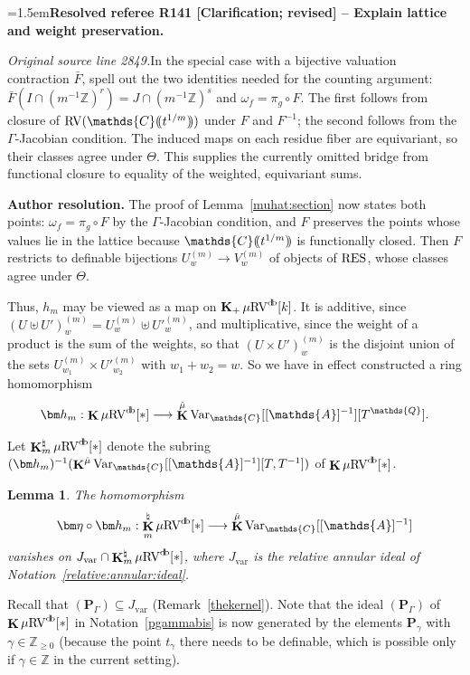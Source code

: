 \documentclass[12pt]{amsart}
\newcommand{\ResolvedRefereeRemark}[5]{%
  \par\medskip\begingroup\normalfont\small\color{gray}%
  \emergencystretch=1.5em\noindent\textbf{Resolved referee R#1 [#2] -- #3.}\par\nobreak\noindent #4\par
  \medskip\color{ResolutionGreen}\noindent\textbf{Author resolution.} #5\par
  \endgroup\medskip
}
\theoremstyle{plain}
\newtheorem{lem}[thm]{Lemma}
\theoremstyle{definition}
\theoremstyle{remark}
\numberwithin{equation}{section}
\theoremstyle{plain}
\newcommand{\RV}{\textup{RV}}
\newcommand{\Z}{\mathds{Z}}
\newcommand{\A}{\mathds{A}}
\newcommand{\C}{\mathds{C}}
\newcommand{\Q}{\mathds{Q}}
\newcommand{\0}{\emptyset}
\newcommand{\dpar}[1]{%
   (\mkern-4mu (#1 )\mkern-4mu )}
\newcommand{\fun}{\longrightarrow}
\newcommand{\sub}{\subseteq}
\newcommand{\mgRV}{{\mu}{\RV}}
\newcommand{\RES}{\textup{RES}}
\DeclareMathOperator{\gsk}{\mathbf{K}_+}
\DeclareMathOperator{\ggk}{\mathbf{K}}
\DeclareMathOperator{\db}{d \! b}
\newcommand{\var}{\textup{Var}}
\newcommand{\gmv}{\ggk^{\hat \mu}\var_{\C}}
\begin{document}
\ResolvedRefereeRemark{141}{Clarification; revised}{Explain lattice and weight preservation}{%
\textit{Original source line 2849.}\quad In the special case with a bijective valuation contraction $\bar F$, spell out the two identities needed for the counting argument: $\bar F(I\cap(m^{-1}\Z)^r)=J\cap(m^{-1}\Z)^s$ and $\omega_f=\pi_g\circ F$. The first follows from closure of $\RV(\C\dpar{t^{1/m}})$ under $F$ and $F^{-1}$; the second follows from the $\Gamma$-Jacobian condition. The induced maps on each residue fiber are equivariant, so their classes agree under $\Theta$. This supplies the currently omitted bridge from functional closure to equality of the weighted, equivariant sums.
}{The proof of Lemma~\ref{muhat:section} now states both points: $\omega_f=\pi_g\circ F$ by the $\Gamma$-Jacobian condition, and $F$ preserves the points whose values lie in the lattice because $\C\dpar{t^{1/m}}$ is functionally closed. Then $F$ restricts to definable bijections $U^{(m)}_w\fun V^{(m)}_w$ of objects of $\RES$, whose classes agree under $\Theta$.}

Thus, $h_m$ may be viewed as a map on $\gsk \mgRV^{\db}[k]$. It is additive, since $(U \uplus U')^{(m)}_w = U^{(m)}_w \uplus U'^{(m)}_w$, and multiplicative, since the weight of a product is the sum of the weights, so that $(U \times U')^{(m)}_w$ is the disjoint union of the sets $U^{(m)}_{w_1} \times U'^{(m)}_{w_2}$ with $w_1 + w_2 = w$. So we have in effect constructed a ring homomorphism
\[
\bm h_m : \ggk \mgRV^{\db}[*] \fun  \ggk^{\hat \mu} \var_{\C}[[\A]^{-1}][T^{\Q}].
\]

Let $\ggk^\natural_m \mgRV^{\db}[*]$ denote the subring $(\bm h_m)^{-1}(\gmv[[\A]^{-1}][T, T^{-1}])$ of $\ggk \mgRV^{\db}[*]$.

\begin{lem}\label{PG:van}
The homomorphism
\[
\bm \eta \circ \bm h_m : \ggk^\natural_m \mgRV^{\db}[*] \fun \gmv[[\A]^{-1}]
\]
vanishes on $J_{\mathrm{var}} \cap \ggk^\natural_m \mgRV^{\db}[*]$, where $J_{\mathrm{var}}$ is the relative annular ideal of Notation~\ref{relative:annular:ideal}.
\end{lem}
Recall that $(\bm P_\Gamma) \sub J_{\mathrm{var}}$ (Remark~\ref{thekernel}). Note that the ideal $(\bm P_\Gamma)$ of $\ggk \mgRV^{\db}[*]$ in Notation~\ref{pgammabis} is now generated by the elements $\bm P_\gamma$ with $\gamma \in \Z_{\geq 0}$ (because the point $t_\gamma$ there needs to be definable, which is possible only if $\gamma \in \Z$ in the current setting).
\end{document}
